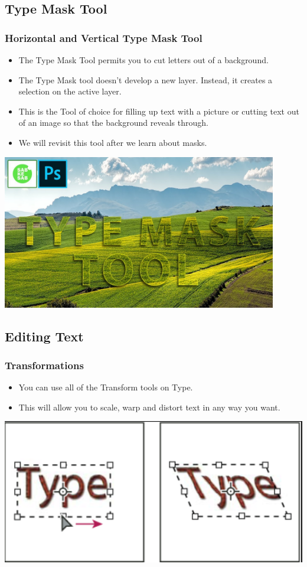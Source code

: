 \documentclass{beamer}
\begin{document}
		\subsection{Type Mask Tool}
\begin{frame}
	\frametitle{Horizontal and Vertical Type Mask Tool}
	\begin{itemize}
		\item The Type Mask Tool permits you to cut letters out of a background.
		\item The Type Mask tool doesn't develop a new layer. Instead, it creates a selection on the active layer.
		\item This is the Tool of choice for filling up text with a picture or cutting text out of an image so that the background reveals through.
		\item We will revisit this tool after we learn about masks.
	\end{itemize}
	\begin{center}
		\includegraphics[width = 0.9\textwidth]{images/maxresdefault (1).jpg}
	\end{center}
\end{frame}

		\subsection{Editing Text}
\begin{frame}
	\frametitle{Transformations}
	\begin{itemize}
		\item You can use all of the Transform tools on Type.
		\item This will allow you to scale, warp and distort text in any way you want.
	\end{itemize}
	\begin{center}
		\includegraphics[width = 1.0\textwidth]{images/type transform.png}
	\end{center}
\end{frame}
\end{document}

